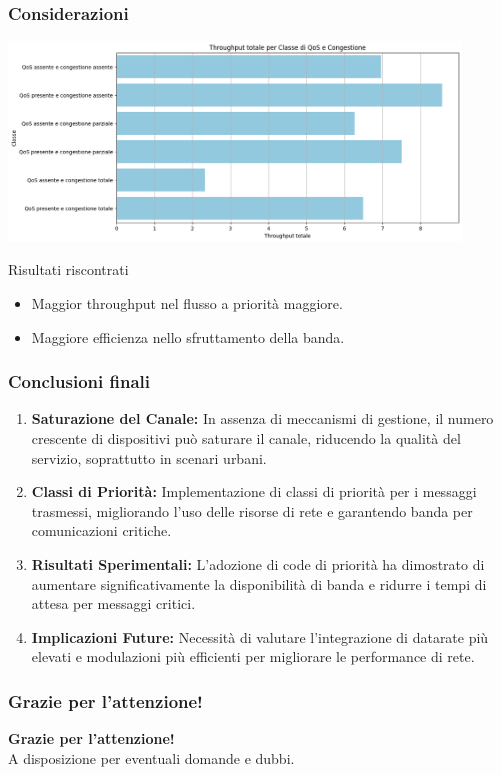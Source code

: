 \documentclass{beamer}
\begin{document}
\begin{frame}
    \frametitle{Considerazioni}
    \centering
    \includegraphics[width=0.9\textwidth]{throughput_bar.png}
    \begin{block}{Risultati riscontrati}
        \begin{itemize}
            \item Maggior throughput nel flusso a priorità maggiore.
            \item Maggiore efficienza nello sfruttamento della banda.
        \end{itemize}
    \end{block}
\end{frame}

\begin{frame}
    \frametitle{Conclusioni finali}

    \begin{enumerate}
        \item \textbf{Saturazione del Canale:} In assenza di meccanismi di gestione, il numero crescente di dispositivi può saturare il canale, riducendo la qualità del servizio, soprattutto in scenari urbani.

        \item \textbf{Classi di Priorità:} Implementazione di classi di priorità per i messaggi trasmessi, migliorando l'uso delle risorse di rete e garantendo banda per comunicazioni critiche.

        \item \textbf{Risultati Sperimentali:} L'adozione di code di priorità ha dimostrato di aumentare significativamente la disponibilità di banda e ridurre i tempi di attesa per messaggi critici.

        \item \textbf{Implicazioni Future:} Necessità di valutare l'integrazione di datarate più elevati e modulazioni più efficienti per migliorare le performance di rete.
    \end{enumerate}

\end{frame}

\begin{frame}
    \frametitle{Grazie per l'attenzione!}

    \begin{center}
        \textbf{Grazie per l'attenzione!} \\[1em]
        A disposizione per eventuali domande e dubbi.
    \end{center}

\end{frame}
\end{document}
